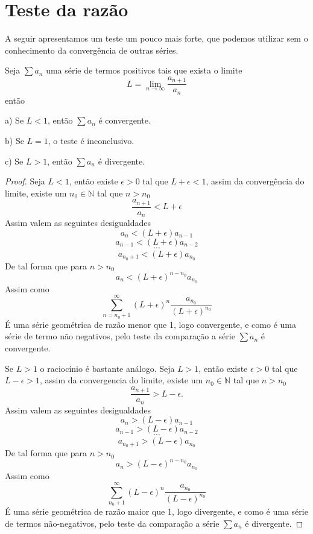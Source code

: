 \section{Teste da razão}
\construirSec

A seguir apresentamos um teste um pouco mais forte, que podemos utilizar sem o
conhecimento da convergência de outras séries.

\begin{teo}
    Seja $\sum a_n$ uma série de termos positivos tais que exista o limite
    $$ L = \lim_{n \to \infty} \frac{a_{n+1}}{a_n} $$
    então
    \item [a)] Se $L < 1$, então $\sum a_n$ é convergente.
    \item [b)] Se $L = 1$, o teste é inconclusivo.
    \item [c)] Se $L > 1$, então $\sum a_n$ é divergente.
\end{teo}

\begin{proof}
    Seja $L<1$, então existe $\epsilon > 0$ tal que $L + \epsilon < 1$, assim
    da convergência do limite, existe um $n_0 \in \mathbb{N}$ tal que $n>n_0$
    $$ \frac{a_{n+1}}{a_n} < L + \epsilon$$
    Assim valem as seguintes desigualdades
    $$ a_{n} < (L + \epsilon)a_{n-1}$$
    $$ a_{n-1} < (L + \epsilon)a_{n-2}$$
    $$ \cdots $$
    $$ a_{n_0+1} < (L + \epsilon)a_{n_0}$$
    De tal forma que para $n > n_0$
    $$ a_n < (L + \epsilon)^{n-n_0}a_{n_0}$$    
    Assim como 
    $$\sum_{n = n_0+1}^{\infty} (L + \epsilon)^{n}\frac{a_{n_0}}{(L + \epsilon)^{n_0}} $$
    É uma série geométrica de razão menor que 1, logo convergente, e como
    é uma série de termo não negativos, pelo teste da comparação a série $\sum a_n$
    é convergente.

    Se $L>1$ o raciocínio é bastante análogo. Seja $L>1$, então existe $\epsilon > 0$
    tal que $L - \epsilon > 1$, assim da convergencia do limite, existe um
    $n_0 \in \mathbb{N}$ tal que $n>n_0$
    $$ \frac{a_{n+1}}{a_n} > L - \epsilon.$$
    Assim valem as seguintes desigualdades
    $$ a_{n} > (L - \epsilon)a_{n-1}$$
    $$ a_{n-1} > (L - \epsilon)a_{n-2}$$
    $$ \cdots $$
    $$ a_{n_0+1} > (L - \epsilon)a_{n_0}$$
    De tal forma que para $n > n_0$
    $$ a_n > (L - \epsilon)^{n-n_0}a_{n_0}$$    
    Assim como 
    $$\sum_{n_0+1}^{\infty} (L - \epsilon)^{n}\frac{a_{n_0}}{(L - \epsilon)^{n_0}} $$
    É uma série geométrica de razão maior que 1, logo divergente, e como
    é uma série de termos não-negativos, pelo teste da comparação a série $\sum a_n$
    é divergente.
\end{proof}
